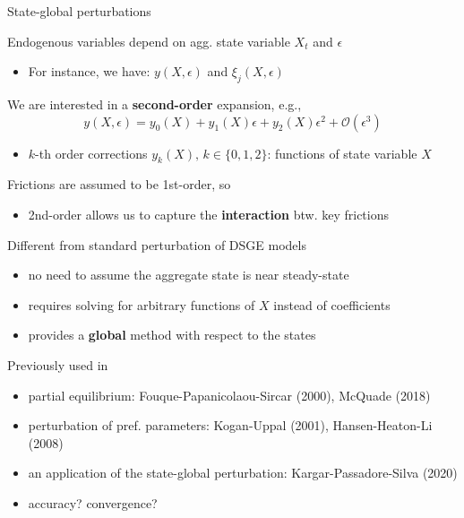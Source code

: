\documentclass[12pt,aspectratio=169]{beamer}
\newenvironment{wideitemize}{\itemize\addtolength{\itemsep}{10pt}}{\enditemize}
\newcommand{\vspM}{\vspace{0.12truecm}}
\begin{document}
\begin{frame}[allowframebreaks]{State-global perturbations}
    \begin{wideitemize}
        \item Endogenous variables depend on agg. state variable $X_t$ and $\epsilon$\vspM
        \begin{itemize}
            \item For instance, we have: $y(X,\epsilon)$ and  $\xi_j(X,\epsilon)$
        \end{itemize}
        \item We are interested in a \textbf{second-order} expansion, e.g.,
        \[y(X,\epsilon) = y_{0}(X) + y_{1}(X) \epsilon + y_{2}(X) \epsilon^2 + \mathcal{O}(\epsilon^3)\]
        \vspace{-6mm}
        \begin{itemize}
            \item $k$-th order corrections $y_k(X),\,k\in\{0,1,2\}$: functions of state variable $X$
        \end{itemize}
        \item Frictions are assumed to be 1st-order, so\vspM
        \begin{itemize}
            \item 2nd-order allows us to capture the \textbf{interaction} btw. key frictions
        \end{itemize}
        \item Different from standard perturbation of DSGE models
        \begin{itemize}
            \item no need to assume the aggregate state is near steady-state\vspM
            \item requires solving for arbitrary functions of $X$ instead of coefficients\vspM
            \item provides a \textbf{global} method with respect to the states
        \end{itemize}
        \item Previously used in
        \begin{itemize}
            \item partial equilibrium: {\scriptsize  Fouque-Papanicolaou-Sircar (2000), McQuade (2018)}
            \item perturbation of pref. parameters: {\scriptsize Kogan-Uppal (2001), Hansen-Heaton-Li (2008)}
            \item an application of the state-global perturbation: {\scriptsize Kargar-Passadore-Silva (2020)}
            \item accuracy? convergence?
        \end{itemize}
    \end{wideitemize}
\end{frame}
\end{document}
